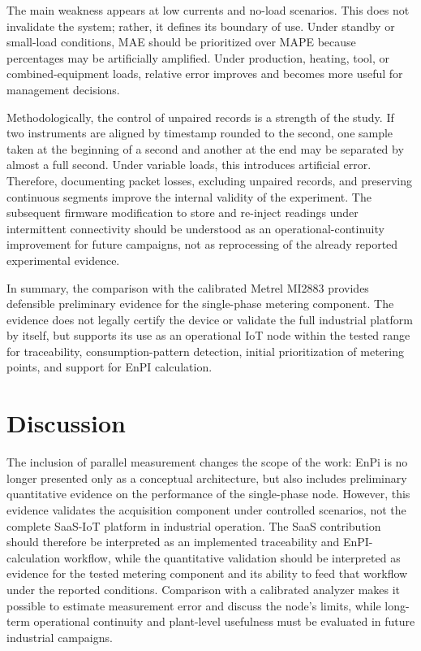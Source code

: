 \documentclass{ieeeaccess}
\begin{document}
The main weakness appears at low currents and no-load scenarios. This does not invalidate the system; rather, it defines its boundary of use. Under standby or small-load conditions, MAE should be prioritized over MAPE because percentages may be artificially amplified. Under production, heating, tool, or combined-equipment loads, relative error improves and becomes more useful for management decisions.

Methodologically, the control of unpaired records is a strength of the study. If two instruments are aligned by timestamp rounded to the second, one sample taken at the beginning of a second and another at the end may be separated by almost a full second. Under variable loads, this introduces artificial error. Therefore, documenting packet losses, excluding unpaired records, and preserving continuous segments improve the internal validity of the experiment. The subsequent firmware modification to store and re-inject readings under intermittent connectivity should be understood as an operational-continuity improvement for future campaigns, not as reprocessing of the already reported experimental evidence.

In summary, the comparison with the calibrated Metrel MI2883 provides defensible preliminary evidence for the single-phase metering component. The evidence does not legally certify the device or validate the full industrial platform by itself, but supports its use as an operational IoT node within the tested range for traceability, consumption-pattern detection, initial prioritization of metering points, and support for EnPI calculation.

\section{Discussion}
\label{sec:discussion}

The inclusion of parallel measurement changes the scope of the work: EnPi is no longer presented only as a conceptual architecture, but also includes preliminary quantitative evidence on the performance of the single-phase node. However, this evidence validates the acquisition component under controlled scenarios, not the complete SaaS-IoT platform in industrial operation. The SaaS contribution should therefore be interpreted as an implemented traceability and EnPI-calculation workflow, while the quantitative validation should be interpreted as evidence for the tested metering component and its ability to feed that workflow under the reported conditions. Comparison with a calibrated analyzer makes it possible to estimate measurement error and discuss the node's limits, while long-term operational continuity and plant-level usefulness must be evaluated in future industrial campaigns.
\end{document}
